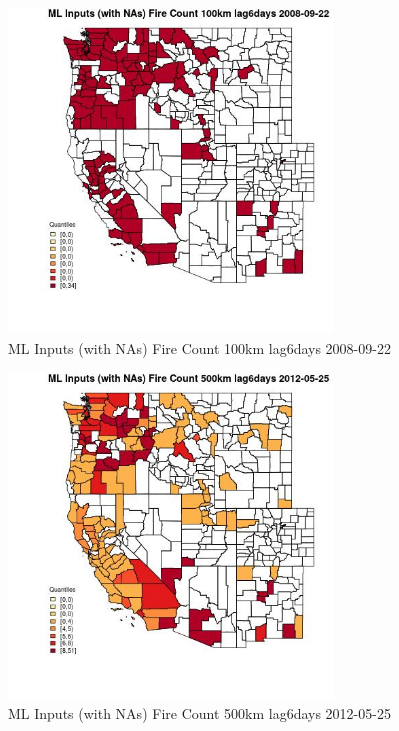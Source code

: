\begin{figure} 
\centering  
\includegraphics[width=0.77\textwidth]{Code_Outputs/Report_ML_input_PM25_Step4_part_e_de_duplicated_aves_compiled_2019-05-18wNAs_CountyFire_Count_100km_lag6daysMean2008-09-22_2008-09-22.jpg} 
\caption{\label{fig:Report_ML_input_PM25_Step4_part_e_de_duplicated_aves_compiled_2019-05-18wNAsCountyFire_Count_100km_lag6daysMean2008-09-22_2008-09-22}ML Inputs (with NAs) Fire Count 100km lag6days 2008-09-22} 
\end{figure} 
 

\begin{figure} 
\centering  
\includegraphics[width=0.77\textwidth]{Code_Outputs/Report_ML_input_PM25_Step4_part_e_de_duplicated_aves_compiled_2019-05-18wNAs_CountyFire_Count_500km_lag6daysMean2012-05-25_2012-05-25.jpg} 
\caption{\label{fig:Report_ML_input_PM25_Step4_part_e_de_duplicated_aves_compiled_2019-05-18wNAsCountyFire_Count_500km_lag6daysMean2012-05-25_2012-05-25}ML Inputs (with NAs) Fire Count 500km lag6days 2012-05-25} 
\end{figure} 
 

